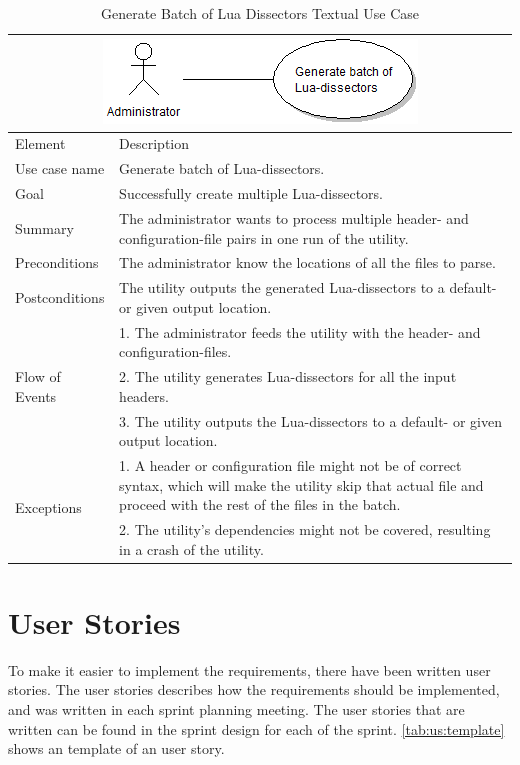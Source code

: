 \begin{table}[htbp] \footnotesize \center
\caption{Generate Batch of Lua Dissectors Textual Use Case\label{tab:textual:luabatch}}
\begin{tabularx}{\textwidth}{l X}
	\multicolumn{2}{c}{\includegraphics[scale=0.8]{./planning/img/uc_luabatch}} \\
	\toprule
	Element & Description\\
	\midrule
	Use case name & Generate batch of Lua-dissectors.\\
	Goal & Successfully create multiple Lua-dissectors. \\
	Summary & The administrator wants to process multiple header- and configuration-file pairs in one run of the utility. \\
	Preconditions & The administrator know the locations of all the files to parse. \\
	Postconditions & The utility outputs the generated Lua-dissectors to a default- or given output location.\\
	\midrule
	\multirow{3}{*}{Flow of Events} &  1. The administrator feeds the utility with the header- and configuration-files.\\
	& 2. The utility generates Lua-dissectors for all the input headers.	\\
	& 3. The utility outputs the Lua-dissectors to a default- or given output location.	\\
	\midrule
	\multirow{2}{*}{Exceptions} & 1. A header or configuration file might not be of correct syntax, which will make the utility skip that actual file and proceed with the rest of the files in the batch.\\
	& 2. The utility's dependencies might not be covered, resulting in a crash of the utility.\\
	\bottomrule
\end{tabularx}
\end{table}

\section{User Stories}
To make it easier to implement the requirements, there have been written user stories. The user stories describes how the requirements should be implemented, and was written in each sprint planning meeting. The user stories that are written can be found in the sprint design for each of the sprint. \autoref{tab:us:template} shows an template of an user story.

